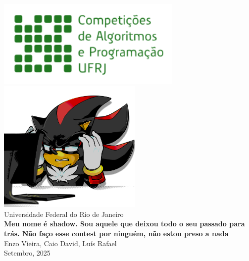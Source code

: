 \begin{titlepage}
    \pagestyle{empty}
	\begin{center}
		\strut %
		
		\includegraphics[width=9cm]{Imagens/projeto.png}
		\includegraphics[width=7cm]{Imagens/Shadow.png}\\[1cm]
		{\fontsize{25}{30}\selectfont Universidade Federal do Rio de Janeiro\\[0.8cm]}
		{\fontsize{40}{30}\selectfont \textbf{Meu nome é shadow. Sou aquele que deixou todo o seu passado para trás. Não faço esse contest por ninguém, não estou preso a nada}
\\[0.8cm]}
		{\LARGE Enzo Vieira, Caio David, Luís Rafael\\}
		\vfill
		\vspace{0.5cm}
		{\huge Setembro, 2025}\\
		\vspace{1cm}
    \end{center}
\end{titlepage}